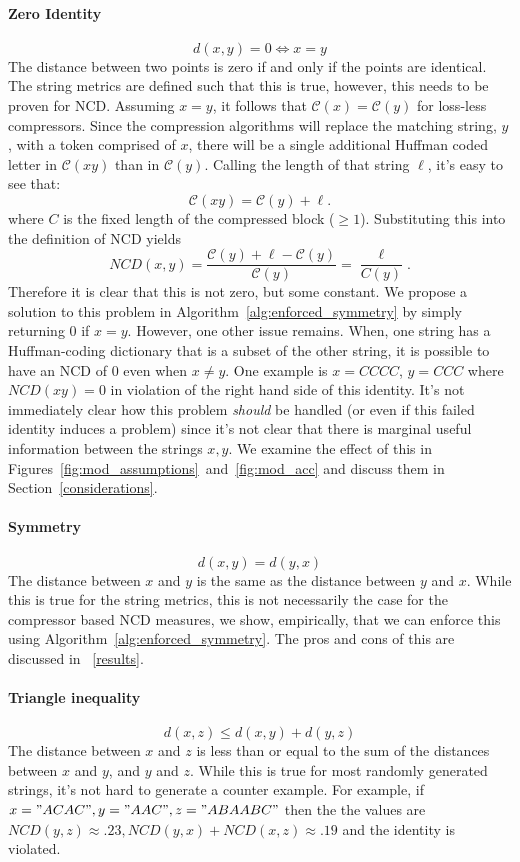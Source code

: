\documentclass[conference]{IEEEtran}
\begin{document}
\paragraph{Zero Identity} 
\[
d(x, y) = 0 \iff x = y
\]
The distance between two points is zero if and only if the points are identical. The string metrics are defined such that this is true, however, this needs to be proven for NCD.
Assuming $x = y$, it follows that $\mathcal{C}(x) = \mathcal{C}(y)$ for loss-less compressors.
Since the compression algorithms will replace the matching string, $y$, with a token comprised of $x$, there will be a single additional Huffman coded letter in $\mathcal{C}(xy)$ than in $\mathcal{C}(y)$. Calling the length of that  string $\ell$, it's easy to see that:
$$
\mathcal{C}(xy) = \mathcal{C}(y) + \ell.
$$
where $C$ is the fixed length of the compressed block ($\geq 1$).
Substituting this into the definition of NCD yields
$$
NCD(x,y) = \frac{\mathcal{C}(y) + \ell - \mathcal{C}(y)}{\mathcal{C}(y)} = \frac{\ell}{C(y)}.
$$
Therefore it is clear that this is not zero, but some constant. We propose a solution to this problem in Algorithm~\ref{alg:enforced_symmetry} by simply returning 0 if $x=y$. However, one other issue remains. 
When, one string has a Huffman-coding dictionary that is a subset of the other string, it is possible to have an NCD of 0 even when $x \neq y$. One example is $x=CCCC$, $y=CCC$ where $NCD(xy)=0$ in violation of the right hand side of this identity. 
It's not immediately clear how this problem \textit{should} be handled (or even if this failed identity induces a problem) since it's not clear that there is marginal useful information between the strings $x,y$. 
We examine the effect of this in Figures~\ref{fig:mod_assumptions}~and~\ref{fig:mod_acc} and discuss them in Section~\ref{considerations}.


\paragraph{Symmetry} 
\[
d(x, y) = d(y, x)
\]
The distance between \( x \) and \( y \) is the same as the distance between \( y \) and \( x \). While this is true for the string metrics, this is not necessarily the case for the compressor based NCD measures, we show, empirically, that we can enforce this using Algorithm~\ref{alg:enforced_symmetry}. The pros and cons of this are discussed in ~\ref{results}.

\paragraph{Triangle inequality} 
\[
d(x, z) \leq d(x, y) + d(y, z)
\]
The distance between \( x \) and \( z \) is less than or equal to the sum of the distances between \( x \) and \( y \), and \( y \) and \( z \). While this is true for most randomly generated strings, it's not hard to generate a counter example. For example, if $ x = "ACAC", y = "AAC", z = "ABAABC" $ then the the values are $ NCD(y,z) \approx .23, NCD(y,x) + NCD(x,z) \approx .19 $ and the identity is violated.
\end{document}
